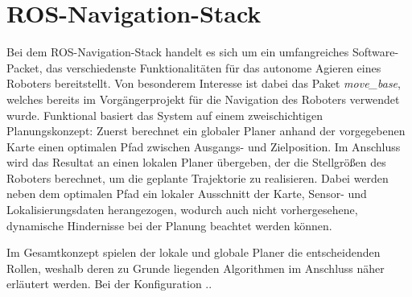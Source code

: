 \chapter{ROS-Navigation-Stack}
Bei dem ROS-Navigation-Stack handelt es sich um ein umfangreiches Software-Packet, das verschiedenste Funktionalitäten für das autonome Agieren eines Roboters bereitstellt. Von besonderem Interesse ist dabei das Paket \textit{move\_base}, welches bereits im Vorgängerprojekt für die Navigation des Roboters verwendet wurde. Funktional basiert das System auf einem zweischichtigen Planungskonzept: Zuerst berechnet ein globaler Planer anhand der vorgegebenen Karte einen optimalen Pfad zwischen Ausgangs- und Zielposition. Im Anschluss wird das Resultat an einen lokalen Planer übergeben, der die Stellgrößen des Roboters berechnet, um die geplante Trajektorie zu realisieren. Dabei werden neben dem optimalen Pfad ein lokaler Ausschnitt der Karte, Sensor- und Lokalisierungsdaten herangezogen, wodurch auch nicht vorhergesehene, dynamische Hindernisse bei der Planung beachtet werden können.

Im Gesamtkonzept spielen der lokale und globale Planer die entscheidenden Rollen, weshalb deren zu Grunde liegenden Algorithmen im Anschluss näher erläutert werden. Bei der Konfiguration ..

\newpage
